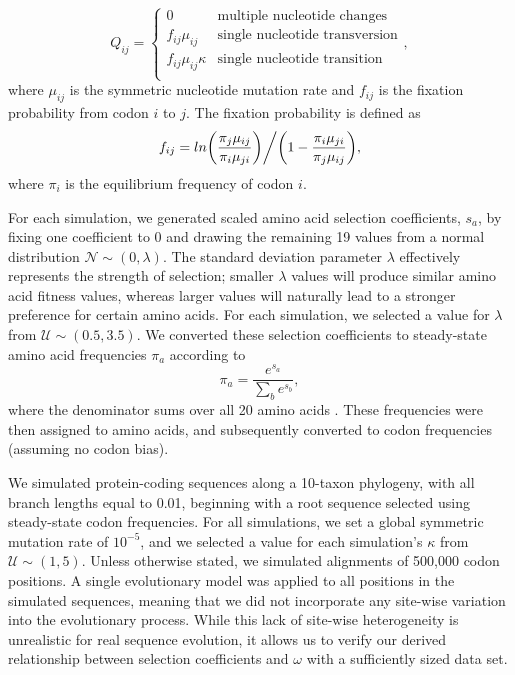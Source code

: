 \documentclass[11pt]{article}
\begin{document}
\begin{equation}
Q_{ij} = \left\{ \begin{array}{rl}
              0                                           &\mbox{multiple nucleotide changes} \\
              f_{ij}\mu_{ij}                          &\mbox{single nucleotide transversion} \\
              f_{ij}\mu_{ij}\kappa               &\mbox{single nucleotide transition} \\
         \end{array} \right.,
\end{equation} where $\mu_{ij}$ is the symmetric nucleotide mutation rate and $f_{ij}$ is the fixation probability from codon $i$ to $j$. The fixation probability is defined as \begin{equation}f_{ij} = ln\bigg{(}\frac{\pi_j\mu_{ij}}{\pi_i\mu_{ji}}\bigg{)}\bigg{/}\bigg{(}1 - \frac{\pi_i\mu_{ji}}{\pi_j\mu_{ij}}\bigg{)},\end{equation} where $\pi_i$ is the equilibrium frequency of codon $i$.

For each simulation, we generated scaled amino acid selection coefficients, $s_a$, by fixing one coefficient to 0 and drawing the remaining 19 values from a normal distribution $\mathcal{N} \sim (0, \lambda)$. The standard deviation parameter $\lambda$ effectively represents the strength of selection; smaller $\lambda$ values will produce similar amino acid fitness values, whereas larger values will naturally lead to a stronger preference for certain amino acids. For each simulation, we selected a value for $\lambda$ from $\mathcal{U} \sim (0.5, 3.5)$.
We converted these selection coefficients to steady-state amino acid frequencies $\pi_a$ according to \begin{equation} \pi_a = \frac{e^{s_a}}{\sum_b e^{s_b}}, \end{equation} where the denominator sums over all 20 amino acids \cite{Ramseyetal2011}. These frequencies were then assigned to amino acids, and subsequently converted to codon frequencies (assuming no codon bias).

We simulated protein-coding sequences along a 10-taxon phylogeny, with all branch lengths equal to 0.01, beginning with a root sequence selected using steady-state codon frequencies. For all simulations, we set a global symmetric mutation rate of $10^{-5}$, and we selected a value for each simulation's $\kappa$ from $\mathcal{U} \sim (1, 5)$. Unless otherwise stated, we simulated alignments of 500,000 codon positions. A single evolutionary model was applied to all positions in the simulated sequences, meaning that we did not incorporate any site-wise variation into the evolutionary process. While this lack of site-wise heterogeneity is unrealistic for real sequence evolution, it allows us to verify our derived relationship between selection coefficients and $\omega$ with a sufficiently sized data set.
\end{document}

